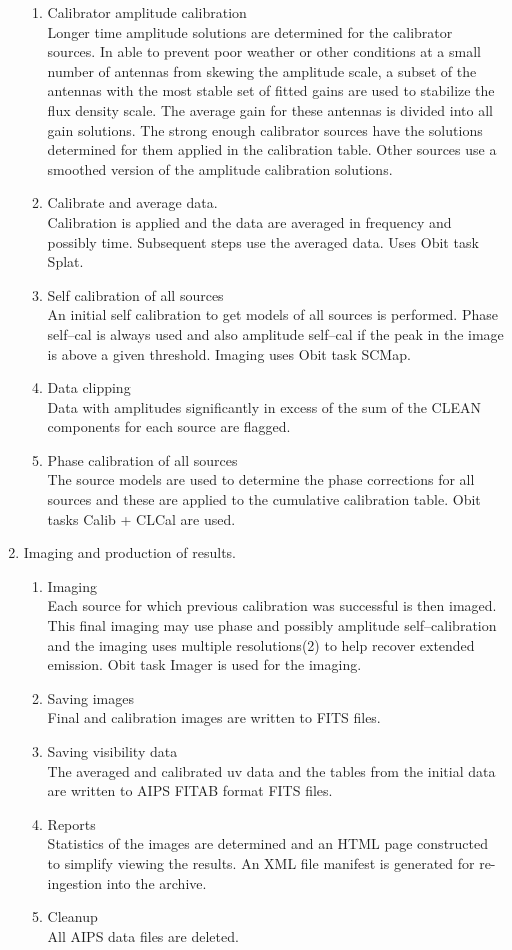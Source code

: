 \documentclass[11pt]{article}
\begin{document}
\begin{enumerate}
\begin {enumerate}
step).
Obit tasks Calib  + CLCal are used.
\item Calibrator amplitude calibration \\
Longer time amplitude solutions are determined for the calibrator
sources. 
In able to prevent poor weather or other conditions at a small number
of antennas from skewing the amplitude scale, a subset of the antennas
with the most stable set of fitted gains are used to stabilize the
flux density scale.
The average gain for these antennas is divided into all gain solutions.
The strong enough calibrator sources have the solutions determined for
them applied in the calibration table.
Other sources use a smoothed version of the amplitude calibration
solutions. 
\item Calibrate and average data. \\
Calibration is applied and the data are averaged in frequency and
possibly time.
Subsequent steps use the averaged data.
Uses Obit task Splat.
\item Self calibration of all sources \\
An initial self calibration to get models of all sources is
performed. 
Phase self--cal is always used and also amplitude self--cal if the
peak in the image is above a given threshold.
Imaging uses Obit task SCMap.
\item Data clipping \\
Data with amplitudes significantly in excess of the sum of the CLEAN
components for each source are flagged.
\item Phase calibration of all sources\\
The source models are used to determine the phase corrections for all
sources and these are applied to the cumulative calibration table.
Obit tasks Calib  + CLCal are used.
\end {enumerate}
\item Imaging and production of results.
\begin {enumerate}
\item Imaging\\
Each source for which previous calibration was successful is then
imaged.
This final imaging may use phase and possibly amplitude
self--calibration and the imaging uses multiple resolutions(2) to help
recover extended emission.
Obit task Imager is used for the imaging.
\item Saving images\\
Final and calibration images are written to FITS files.
\item Saving visibility data\\
The averaged and calibrated uv data and the tables from the initial
data are written to AIPS FITAB format FITS files.
\item Reports\\
Statistics of the images are determined and an HTML page constructed to
simplify viewing the results.
An XML file manifest is generated for re-ingestion into the archive.
\item Cleanup\\
All AIPS data files are deleted.
\end {enumerate}
\end {enumerate}
\end{document}

